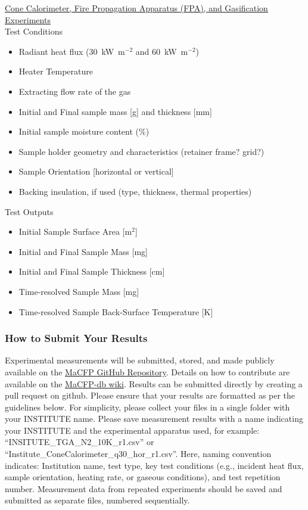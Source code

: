 \documentclass[12pt]{article}
\begin{document}
\noindent \underline{Cone Calorimeter, Fire Propagation Apparatus (FPA), and Gasification Experiments}\\

\noindent Test Conditions
\begin{itemize}[noitemsep]
\item Radiant heat flux (30~kW~m$^{-2}$ and 60~kW~m$^{-2}$)
\item Heater Temperature
\item Extracting flow rate of the gas
\item Initial and Final sample mass [g] and thickness [mm]
\item Initial sample moisture content (\%)
\item Sample holder geometry and characteristics (retainer frame? grid?)
\item Sample Orientation [horizontal or vertical]
\item Backing insulation, if used (type, thickness, thermal properties)
\end{itemize}

\clearpage
\noindent Test Outputs
\begin{itemize}[noitemsep]
\item Initial Sample Surface Area [m$^2$]
\item Initial and Final Sample Mass [mg]
\item Initial and Final Sample Thickness [cm]
\item Time-resolved Sample Mass [mg]
\item Time-resolved Sample Back-Surface Temperature [K] 
\end{itemize}

\subsubsection{How to Submit Your Results}
\label{ssec: Pyrolysis Communicating Results}
Experimental measurements will be submitted, stored, and made publicly available on the \href{https://github.com/MaCFP/matl-db/tree/master/Wood}{MaCFP GitHub Repository}. Details on how to contribute are available on the \href{https://github.com/MaCFP/macfp-db/wiki/How-to-Contribute}{MaCFP-db wiki}. Results can be submitted directly by creating a pull request on github. Please ensure that your results are formatted as per the guidelines below.
For simplicity, please collect your files in a single folder with your INSTITUTE name. Please save measurement results with a name indicating your INSTITUTE and the experimental apparatus used, for example: “INSITUTE\_TGA\_N2\_10K\_r1.csv” or “Institute\_ConeCalorimeter\_q30\_hor\_r1.csv”. Here, naming convention indicates: Institution name, test type, key test conditions (e.g., incident heat flux, sample orientation, heating rate, or gaseous conditions), and test repetition number. Measurement data from repeated experiments should be saved and submitted as separate files, numbered sequentially. 
\end{document}
